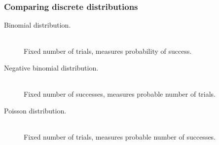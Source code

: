 \begin{frame}
  \frametitle{Comparing discrete distributions}

  \begin{description}
  \item[Binomial distribution.] \hfill \\
    Fixed number of trials, measures probability of success.
  \item[Negative binomial distribution.] \hfill \\
    Fixed number of successes, measures probable number of trials.
  \item[Poisson distribution.] \hfill \\
    Fixed number of trials, measures probable number of successes.
  \end{description}

\end{frame}

